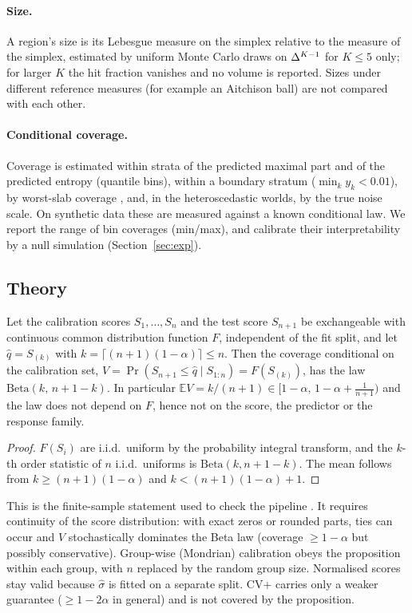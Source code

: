 \paragraph{Size.} A region's size is its Lebesgue measure on the simplex relative to the measure of the simplex, estimated by uniform Monte Carlo draws on $\Delta^{K-1}$ for $K\le5$ only; for larger $K$ the hit fraction vanishes and no volume is reported. Sizes under different reference measures (for example an Aitchison ball) are not compared with each other.
\paragraph{Conditional coverage.} Coverage is estimated within strata of the predicted maximal part and of the predicted entropy (quantile bins), within a boundary stratum ($\min_k y_k<0.01$), by worst-slab coverage \citep[a slab chosen on one half of the test data and evaluated on the other;][]{romano2020classification}, and, in the heteroscedastic worlds, by the true noise scale. On synthetic data these are measured against a known conditional law. We report the range of bin coverages (min/max), and calibrate their interpretability by a null simulation (Section~\ref{sec:exp}).

\subsection{Theory}\label{sec:theory}
\begin{proposition}\label{prop:beta}
Let the calibration scores $S_1,\dots,S_n$ and the test score $S_{n+1}$ be exchangeable with continuous common distribution function $F$, independent of the fit split, and let $\hat q=S_{(k)}$ with $k=\lceil (n+1)(1-\alpha)\rceil\le n$. Then the coverage conditional on the calibration set, $V=\Pr(S_{n+1}\le\hat q\mid S_{1:n})=F(S_{(k)})$, has the law $\mathrm{Beta}(k,\,n+1-k)$. In particular $\mathbb E V=k/(n+1)\in[1-\alpha,\,1-\alpha+\tfrac1{n+1})$ and the law does not depend on $F$, hence not on the score, the predictor or the response family.
\end{proposition}
\begin{proof}
$F(S_i)$ are i.i.d.\ uniform by the probability integral transform, and the $k$-th order statistic of $n$ i.i.d.\ uniforms is $\mathrm{Beta}(k,n+1-k)$. The mean follows from $k\ge(n+1)(1-\alpha)$ and $k<(n+1)(1-\alpha)+1$.
\end{proof}
This is the finite-sample statement used to check the pipeline \citep{angelopoulos2021gentle}. It requires continuity of the score distribution: with exact zeros or rounded parts, ties can occur and $V$ stochastically dominates the Beta law (coverage $\ge1-\alpha$ but possibly conservative). Group-wise (Mondrian) calibration obeys the proposition within each group, with $n$ replaced by the random group size. Normalised scores stay valid because $\hat\sigma$ is fitted on a separate split. CV+ carries only a weaker guarantee ($\ge 1-2\alpha$ in general) and is not covered by the proposition.

